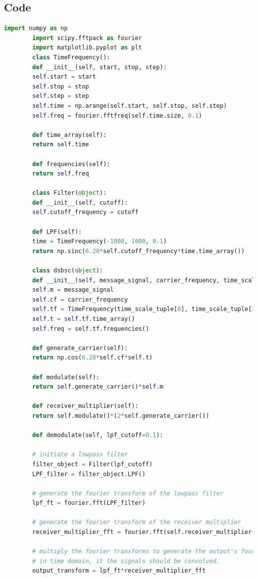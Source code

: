 \documentclass[12pt,a4paper]{article}%
\begin{document}
	\subsection{Code}
	\begin{flushleft}
		\lstset{numbers=left, 
			numberstyle=\tiny, 
			breaklines=true,
			numbersep=5pt} 
		\begin{lstlisting}[language=python,caption={Mod Demod Codes}]
		import numpy as np
		import scipy.fftpack as fourier
		import matplotlib.pyplot as plt
		class TimeFrequency():
		def __init__(self, start, stop, step):
		self.start = start
		self.stop = stop
		self.step = step
		self.time = np.arange(self.start, self.stop, self.step)
		self.freq = fourier.fftfreq(self.time.size, 0.1)
		
		def time_array(self):
		return self.time
		
		def frequencies(self):
		return self.freq
		
		class Filter(object):
		def __init__(self, cutoff):
		self.cutoff_frequency = cutoff
		
		def LPF(self):
		time = TimeFrequency(-1000, 1000, 0.1)
		return np.sinc(6.28*self.cutoff_frequency*time.time_array())
		
		class dsbsc(object):
		def __init__(self, message_signal, carrier_frequency, time_scale_tuple):
		self.m = message_signal
		self.cf = carrier_frequency
		self.tf = TimeFrequency(time_scale_tuple[0], time_scale_tuple[1],time_scale_tuple[2])
		self.t = self.tf.time_array()
		self.freq = self.tf.frequencies()
		
		def generate_carrier(self):
		return np.cos(6.28*self.cf*self.t)
		
		def modulate(self):
		return self.generate_carrier()*self.m
		
		def receiver_multiplier(self):
		return self.modulate()*(2*self.generate_carrier())
		
		def demodulate(self, lpf_cutoff=0.1):
		
		# initiate a lowpass filter
		filter_object = Filter(lpf_cutoff)
		LPF_filter = filter_object.LPF()
		
		# generate the fourier transform of the lowpass filter
		lpf_ft = fourier.fft(LPF_filter)
		
		# generate the fourier transform of the receiver multiplier
		receiver_multiplier_fft = fourier.fft(self.receiver_multiplier())
		
		# multiply the fourier transforms to generate the output's fourier transform
		# in time domain, it the signals should be convolved.
		output_transform = lpf_ft*receiver_multiplier_fft
		

\end{lstlisting}
\end{flushleft}
\end{document}
